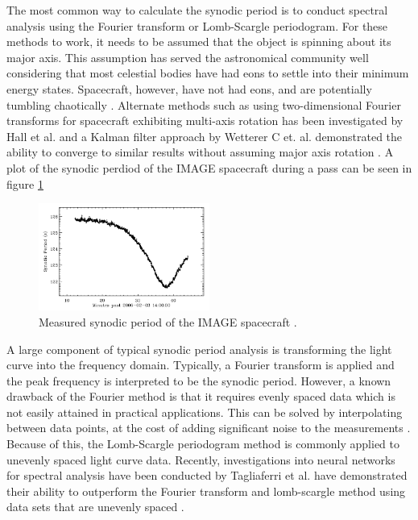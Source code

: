 \documentclass{article}
\begin{document}
The most common way to calculate the synodic period is to conduct spectral analysis using the Fourier transform or Lomb-Scargle periodogram. For these methods to work, it needs to be assumed that the object is spinning about its major axis. This assumption has served the astronomical community well considering that most celestial bodies have had eons to settle into their minimum energy states. Spacecraft, however, have not had eons, and are potentially tumbling chaotically \cite{AMOS}. Alternate methods such as using two-dimensional Fourier transforms for spacecraft exhibiting multi-axis rotation has been investigated by Hall et al.  and a Kalman filter approach by  Wetterer C et. al. demonstrated the ability to converge to similar results without assuming major axis rotation \cite{Hall2014OpticalCO} \cite{AttitudeEstimationFromLightCurve}. A plot of the synodic perdiod of the IMAGE spacecraft during a pass can be seen in figure \ref{synodic_im}

\begin{figure}[h]
	\centering
	\includegraphics[width=0.5\textwidth]{synodic_period_AMOS}
	\caption{Measured synodic period of the IMAGE spacecraft \cite{AMOS}.}
	\label{synodic_im}
\end{figure}

A large component of typical synodic period analysis is transforming the light curve into the frequency domain. Typically, a Fourier transform is applied and the peak frequency is interpreted to be the synodic period. However, a known drawback of the Fourier method is that it requires evenly spaced data which is not easily attained in practical applications. This can be solved by interpolating between data points, at the cost of adding significant noise to the measurements \cite{Tagliaferri}. Because of this, the Lomb-Scargle periodogram method is commonly applied to unevenly spaced light curve data. Recently, investigations into neural networks for spectral analysis have been conducted by Tagliaferri et al. have demonstrated their ability to outperform the Fourier transform and lomb-scargle method using data sets that are unevenly spaced \cite{Tagliaferri}.
\end{document}
